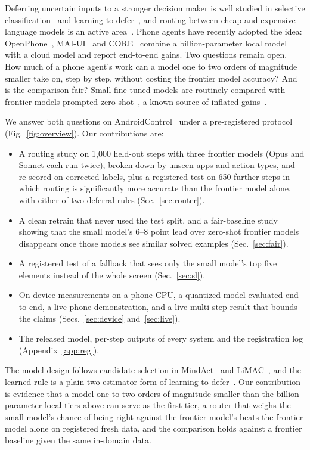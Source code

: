 \documentclass[10pt]{article}
\begin{document}
Deferring uncertain inputs to a stronger decision maker is well studied in selective classification~\citep{chow,geifman} and learning to defer~\citep{mozannar}, and routing between cheap and expensive language models is an active area~\citep{frugalgpt,automix,hybridllm,routellm}. Phone agents have recently adopted the idea: OpenPhone~\citep{openphone}, MAI-UI~\citep{maiui} and CORE~\citep{core} combine a billion-parameter local model with a cloud model and report end-to-end gains. Two questions remain open. How much of a phone agent's work can a model one to two orders of magnitude smaller take on, step by step, without costing the frontier model accuracy? And is the comparison fair? Small fine-tuned models are routinely compared with frontier models prompted zero-shot~\citep{limac}, a known source of inflated gains~\citep{melis,dacrema}.

We answer both questions on AndroidControl~\citep{androidcontrol} under a pre-registered protocol (Fig.~\ref{fig:overview}). Our contributions are:
\begin{itemize}\setlength\itemsep{1pt}
\item A routing study on 1{,}000 held-out steps with three frontier models (Opus and Sonnet each run twice), broken down by unseen apps and action types, and re-scored on corrected labels, plus a registered test on 650 further steps in which routing is significantly more accurate than the frontier model alone, with either of two deferral rules (Sec.~\ref{sec:router}).
\item A clean retrain that never used the test split, and a fair-baseline study showing that the small model's 6--8 point lead over zero-shot frontier models disappears once those models see similar solved examples (Sec.~\ref{sec:fair}).
\item A registered test of a fallback that sees only the small model's top five elements instead of the whole screen (Sec.~\ref{sec:sl}).
\item On-device measurements on a phone CPU, a quantized model evaluated end to end, a live phone demonstration, and a live multi-step result that bounds the claims (Secs.~\ref{sec:device} and~\ref{sec:live}).
\item The released model, per-step outputs of every system and the registration log (Appendix~\ref{app:reg}).
\end{itemize}
The model design follows candidate selection in MindAct~\citep{mind2web} and LiMAC~\citep{limac}, and the learned rule is a plain two-estimator form of learning to defer~\citep{mozannar}. Our contribution is evidence that a model one to two orders of magnitude smaller than the billion-parameter local tiers above can serve as the first tier, a router that weighs the small model's chance of being right against the frontier model's beats the frontier model alone on registered fresh data, and the comparison holds against a frontier baseline given the same in-domain data.
\end{document}
